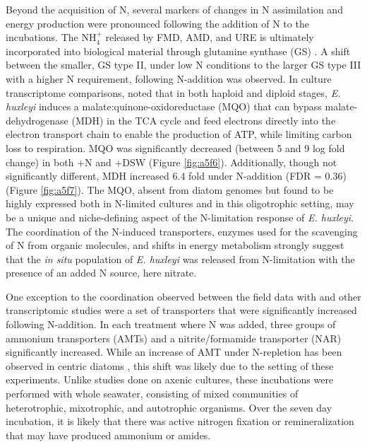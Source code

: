 Beyond the acquisition of N, several markers of changes in N assimilation and energy production were pronounced following the addition of N to the incubations. The NH$_{4}^+$ released by FMD, AMD, and URE is ultimately incorporated into biological material through glutamine synthase (GS) \citep{Rokitta2014}. A shift between the smaller, GS type II, under low N conditions to the larger GS type III with a higher N requirement, following N-addition was observed. In culture transcriptome comparisons, \citet{Rokitta2014} noted that in both haploid and diploid stages, \textit{E. huxleyi} induces a malate:quinone-oxidoreductase (MQO) that can bypass malate-dehydrogenase (MDH) in the TCA cycle and feed electrons directly into the electron transport chain to enable the production of ATP, while limiting carbon loss to respiration. MQO was significantly decreased (between 5 and 9 log fold change) in both +N and +DSW (Figure \ref{fig:a5f6}). Additionally, though not significantly different, MDH increased 6.4 fold under N-addition (FDR = 0.36) (Figure \ref{fig:a5f7}). The MQO, absent from diatom genomes but found to be highly expressed both in N-limited cultures and in this oligotrophic setting, may be a unique and niche-defining aspect of the N-limitation response of \textit{E. huxleyi}. The coordination of the N-induced transporters, enzymes used for the scavenging of N from organic molecules, and shifts in energy metabolism strongly suggest that the \textit{in situ} population of \textit{E. huxleyi} was released from N-limitation with the presence of an added N source, here nitrate.\par

One exception to the coordination observed between the field data with \citet{McKew2015} and other transcriptomic studies \citep{Dyhrman2006, Rokitta2014} were a set of transporters that were significantly increased following N-addition. In each treatment where N was added, three groups of ammonium transporters (AMTs) and a nitrite/formamide transporter (NAR) significantly increased. While an increase of AMT under N-repletion has been observed in centric diatoms \citep{Bender2014}, this shift was likely due to the setting of these experiments. Unlike studies done on axenic cultures, these incubations were performed with whole seawater, consisting of mixed communities of heterotrophic, mixotrophic, and autotrophic organisms. Over the seven day incubation, it is likely that there was active nitrogen fixation \citep{Karl1997} or remineralization \citep{Casciotti2008} that may have produced ammonium or amides. \par

